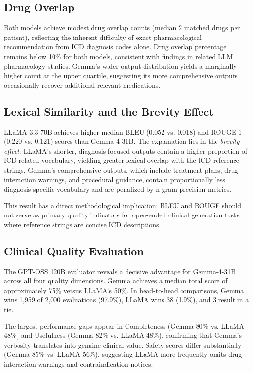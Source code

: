 \documentclass[10pt, twocolumn, a4paper]{article}
\begin{document}
\subsection{Drug Overlap}
Both models achieve modest drug overlap counts (median 2 matched drugs per patient), reflecting the inherent difficulty of exact pharmacological recommendation from ICD diagnosis codes alone. Drug overlap percentage remains below 10\% for both models, consistent with findings in related LLM pharmacology studies. Gemma's wider output distribution yields a marginally higher count at the upper quartile, suggesting its more comprehensive outputs occasionally recover additional relevant medications.

\subsection{Lexical Similarity and the Brevity Effect}
LLaMA-3.3-70B achieves higher median BLEU (0.052 vs. 0.018) and ROUGE-1 (0.220 vs. 0.121) scores than Gemma-4-31B. The explanation lies in the \textit{brevity effect}: LLaMA's shorter, diagnosis-focused outputs contain a higher proportion of ICD-related vocabulary, yielding greater lexical overlap with the ICD reference strings. Gemma's comprehensive outputs, which include treatment plans, drug interaction warnings, and procedural guidance, contain proportionally less diagnosis-specific vocabulary and are penalized by n-gram precision metrics.

This result has a direct methodological implication: BLEU and ROUGE should not serve as primary quality indicators for open-ended clinical generation tasks where reference strings are concise ICD descriptions.

\subsection{Clinical Quality Evaluation}
The GPT-OSS 120B evaluator reveals a decisive advantage for Gemma-4-31B across all four quality dimensions. Gemma achieves a median total score of approximately 75\% versus LLaMA's 50\%. In head-to-head comparisons, Gemma wins 1,959 of 2,000 evaluations (97.9\%), LLaMA wins 38 (1.9\%), and 3 result in a tie.

The largest performance gaps appear in Completeness (Gemma 80\% vs. LLaMA 48\%) and Usefulness (Gemma 82\% vs. LLaMA 48\%), confirming that Gemma's verbosity translates into genuine clinical value. Safety scores differ substantially (Gemma 85\% vs. LLaMA 56\%), suggesting LLaMA more frequently omits drug interaction warnings and contraindication notices.
\end{document}
